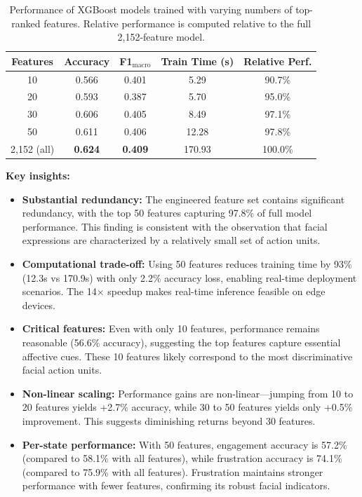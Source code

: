 \begin{table}[t]
\centering
\caption{Performance of XGBoost models trained with varying numbers of top-ranked features. Relative performance is computed relative to the full 2,152-feature model.}
\label{tab:ablation-results}
\begin{tabular}{ccccc}
\toprule
\textbf{Features} & \textbf{Accuracy} & \textbf{F1$_{\text{macro}}$} & \textbf{Train Time (s)} & \textbf{Relative Perf.} \\
\midrule
10 & 0.566 & 0.401 & 5.29 & 90.7\% \\
20 & 0.593 & 0.387 & 5.70 & 95.0\% \\
30 & 0.606 & 0.405 & 8.49 & 97.1\% \\
50 & 0.611 & 0.406 & 12.28 & 97.8\% \\
2,152 (all) & \textbf{0.624} & \textbf{0.409} & 170.93 & 100.0\% \\
\bottomrule
\end{tabular}
\end{table}

\textbf{Key insights:}
\begin{itemize}
    \item \textbf{Substantial redundancy:} The engineered feature set contains significant redundancy, with the top 50 features capturing 97.8\% of full model performance. This finding is consistent with the observation that facial expressions are characterized by a relatively small set of action units.

    \item \textbf{Computational trade-off:} Using 50 features reduces training time by 93\% (12.3s vs 170.9s) with only 2.2\% accuracy loss, enabling real-time deployment scenarios. The 14$\times$ speedup makes real-time inference feasible on edge devices.

    \item \textbf{Critical features:} Even with only 10 features, performance remains reasonable (56.6\% accuracy), suggesting the top features capture essential affective cues. These 10 features likely correspond to the most discriminative facial action units.

    \item \textbf{Non-linear scaling:} Performance gains are non-linear---jumping from 10 to 20 features yields +2.7\% accuracy, while 30 to 50 features yields only +0.5\% improvement. This suggests diminishing returns beyond 30 features.
    
    \item \textbf{Per-state performance:} With 50 features, engagement accuracy is 57.2\% (compared to 58.1\% with all features), while frustration accuracy is 74.1\% (compared to 75.9\% with all features). Frustration maintains stronger performance with fewer features, confirming its robust facial indicators.
\end{itemize}

